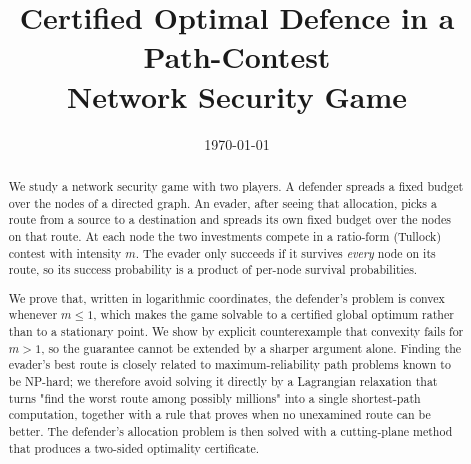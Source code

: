 \documentclass[11pt,a4paper]{article}
\theoremstyle{plain}
\theoremstyle{definition}
\begin{document}
\title{\bf Certified Optimal Defence in a Path-Contest\\ Network Security Game}

\author{}
\date{\today}
\maketitle

\begin{abstract}
We study a network security game with two players. A defender spreads a
fixed budget over the nodes of a directed graph. An evader, after seeing
that allocation, picks a route from a source to a destination and spreads
its own fixed budget over the nodes on that route. At each node the two
investments compete in a ratio-form (Tullock) contest with intensity $m$.
The evader only succeeds if it survives \emph{every} node on its route, so
its success probability is a product of per-node survival probabilities.

We prove that, written in logarithmic coordinates, the defender's problem
is convex whenever $m \le 1$, which makes the game solvable to a certified
global optimum rather than to a stationary point. We show by explicit
counterexample that convexity fails for $m>1$, so the guarantee cannot be
extended by a sharper argument alone. Finding the evader's best route is
closely related to maximum-reliability path problems known to be NP-hard;
we therefore avoid solving it directly by a
Lagrangian relaxation that turns "find the worst route among possibly
millions" into a single shortest-path computation, together with a rule
that proves when no unexamined route can be better. The defender's
allocation problem is then solved with a cutting-plane method that
produces a two-sided optimality certificate.


\end{abstract}
\end{document}
